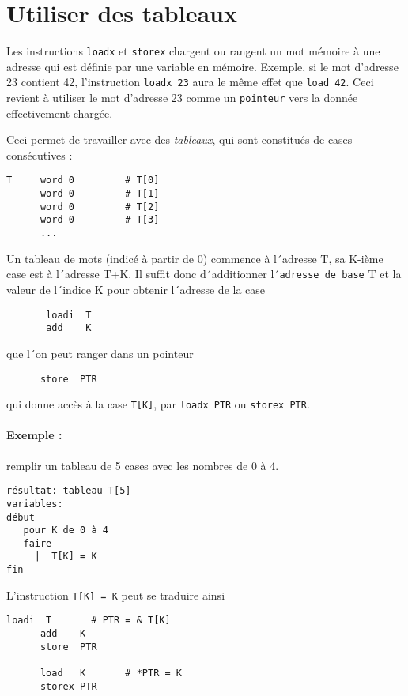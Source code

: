 \documentclass[10pt]{article}
\begin{document}
\section{Utiliser des tableaux}

Les instructions \texttt{loadx} et \texttt{storex} chargent ou rangent
un mot mémoire à une adresse qui est définie par une variable en
mémoire. Exemple, si le mot d'adresse 23 contient 42, l'instruction
\texttt{loadx 23} aura le même effet que \texttt{load 42}.  Ceci
revient à utiliser le mot d'adresse 23 comme un \texttt{pointeur} vers
la donnée effectivement chargée.


Ceci permet de travailler avec des \emph{tableaux}, qui sont constitués
de cases consécutives :
\begin{lstlisting}
T     word 0         # T[0]
      word 0         # T[1]
      word 0         # T[2]
      word 0         # T[3]
      ...
\end{lstlisting}

Un tableau de
mots (indicé à partir de 0) commence à l´adresse T, sa K-ième case est
à l´adresse T+K. Il suffit donc d´additionner l´\texttt{adresse de base} T
et la valeur de l´indice K pour obtenir l´adresse de la case
\begin{lstlisting}
       loadi  T
       add    K
\end{lstlisting}
que l´on peut ranger dans un pointeur
\begin{lstlisting}
      store  PTR
\end{lstlisting}
qui donne accès à la case \verb/T[K]/, par 
\texttt{loadx  PTR}
ou 
\texttt{storex  PTR}.

\paragraph{Exemple :} remplir un tableau de 5 cases avec les nombres de 0 à 4.

\begin{lstlisting}[frame=single]
résultat: tableau T[5]
variables:  
début
   pour K de 0 à 4
   faire 
     |  T[K] = K
fin
\end{lstlisting}

L'instruction \verb/T[K] = K/ peut se traduire ainsi
\begin{lstlisting}[frame=single]
      loadi  T       # PTR = & T[K]
      add    K
      store  PTR
   
      load   K       # *PTR = K
      storex PTR
\end{lstlisting}
\end{document}
